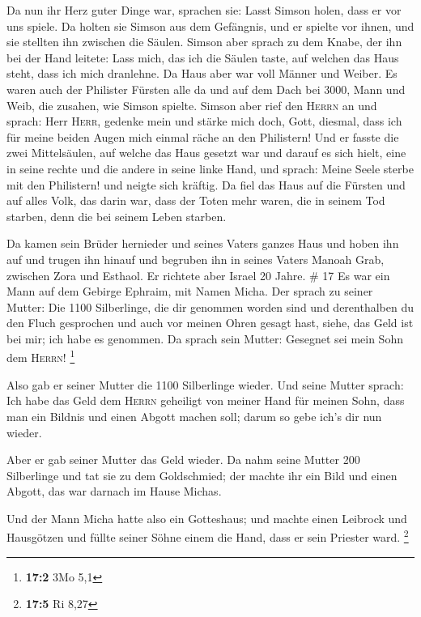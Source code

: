  Da nun ihr Herz guter Dinge war, sprachen sie: Lasst
Simson holen, dass er vor uns spiele. Da holten sie Simson aus dem
Gefängnis, und er spielte vor ihnen, und sie stellten ihn zwischen die
Säulen.  Simson aber sprach zu dem Knabe, der ihn bei der
Hand leitete: Lass mich, das ich die Säulen taste, auf welchen das Haus
steht, dass ich mich dranlehne.  Da Haus aber war voll
Männer und Weiber. Es waren auch der Philister Fürsten alle da und auf
dem Dach bei 3000, Mann und Weib, die zusahen, wie Simson spielte.
 Simson aber rief den \textsc{Herrn} an und sprach: Herr
\textsc{Herr}, gedenke mein und stärke mich doch, Gott, diesmal, dass
ich für meine beiden Augen mich einmal räche an den Philistern!
 Und er fasste die zwei Mittelsäulen, auf welche das Haus
gesetzt war und darauf es sich hielt, eine in seine rechte und die
andere in seine linke Hand,  und sprach: Meine Seele
sterbe mit den Philistern! und neigte sich kräftig. Da fiel das Haus auf
die Fürsten und auf alles Volk, das darin war, dass der Toten mehr
waren, die in seinem Tod starben, denn die bei seinem Leben starben.

 Da kamen sein Brüder hernieder und seines Vaters ganzes
Haus und hoben ihn auf und trugen ihn hinauf und begruben ihn in seines
Vaters Manoah Grab, zwischen Zora und Esthaol. Er richtete aber Israel
20 Jahre. \# 17  Es war ein Mann auf dem Gebirge Ephraim,
mit Namen Micha.  Der sprach zu seiner Mutter: Die 1100
Silberlinge, die dir genommen worden sind und derenthalben du den Fluch
gesprochen und auch vor meinen Ohren gesagt hast, siehe, das Geld ist
bei mir; ich habe es genommen. Da sprach sein Mutter: Gesegnet sei mein
Sohn dem \textsc{Herrn}! \footnote{\textbf{17:2} 3Mo 5,1}

 Also gab er seiner Mutter die 1100 Silberlinge wieder.
Und seine Mutter sprach: Ich habe das Geld dem \textsc{Herrn} geheiligt
von meiner Hand für meinen Sohn, dass man ein Bildnis und einen Abgott
machen soll; darum so gebe ich's dir nun wieder.

 Aber er gab seiner Mutter das Geld wieder. Da nahm seine
Mutter 200 Silberlinge und tat sie zu dem Goldschmied; der machte ihr
ein Bild und einen Abgott, das war darnach im Hause Michas.

 Und der Mann Micha hatte also ein Gotteshaus; und machte
einen Leibrock und Hausgötzen und füllte seiner Söhne einem die Hand,
dass er sein Priester ward. \footnote{\textbf{17:5} Ri 8,27}


